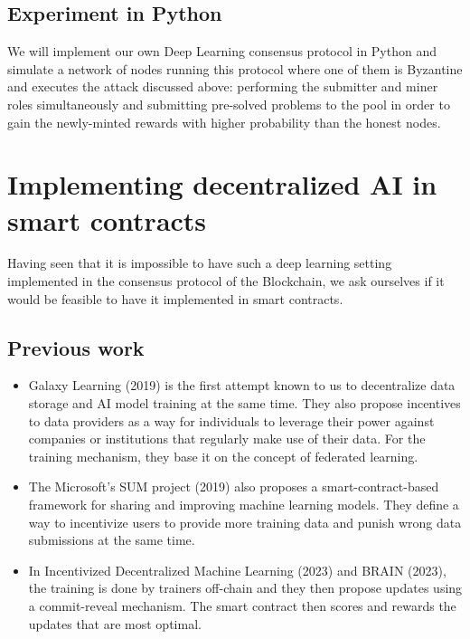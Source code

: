 \documentclass[conference]{IEEEtran}
\begin{document}
    \subsection{Experiment in Python}
    
    We will implement our own Deep Learning consensus protocol in Python and simulate a network of nodes running this protocol where one of them is Byzantine and executes the attack discussed above: performing the submitter and miner roles simultaneously and submitting pre-solved problems to the pool in order to gain the newly-minted rewards with higher probability than the honest nodes.
    
    
    
    \section{Implementing decentralized AI in smart contracts}
    
    Having seen that it is impossible to have such a deep learning setting implemented in the consensus protocol of the Blockchain, we ask ourselves if it would be feasible to have it implemented in smart contracts.
    
    \subsection{Previous work}
    
    \begin{itemize}
    \item Galaxy Learning (2019)\cite{} is the first attempt known to us to decentralize data storage and AI model training at the same time. They also propose incentives to data providers as a way for individuals to leverage their power against companies or institutions that regularly make use of their data. For the training mechanism, they base it on the concept of federated learning.
    \item The Microsoft's SUM project (2019)\cite{} also proposes a smart-contract-based framework for sharing and improving machine learning models. They define a way to incentivize users to provide more training data and punish wrong data submissions at the same time.
    \item In Incentivized Decentralized Machine Learning (2023)\cite{} and BRAIN (2023)\cite{}, the training is done by trainers off-chain and they then propose updates using a commit-reveal mechanism. The smart contract then scores and rewards the updates that are most optimal.
    \end{itemize}
    
\end{document}
